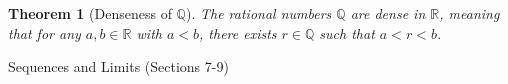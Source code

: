 \documentclass[7pt]{article}
\theoremstyle{definition}
\newtheorem{definition}{Definition}
\theoremstyle{plain}
\newtheorem{theorem}{Theorem}
\newtheorem{proposition}{Proposition}
\begin{document}




\begin{theorem}[Denseness of $ \mathbb{Q} $]
The rational numbers $ \mathbb{Q} $ are dense in $ \mathbb{R} $, meaning that for any $ a, b \in \mathbb{R} $ with $ a < b $, there exists $ r \in \mathbb{Q} $ such that $ a < r < b $.
\end{theorem}
{Sequences and Limits (Sections 7-9)}


\end{document}
